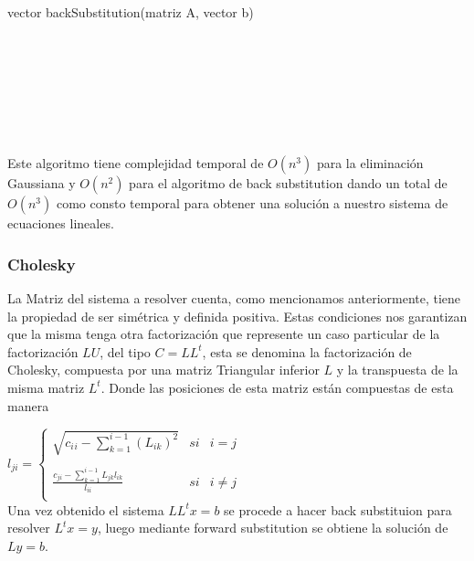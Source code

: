 \begin{algorithm}
    \begin{algorithmic}[1]\parskip=2mm
        \caption{vector backSubstitution(matriz A, vector b)}
        \\
        \\
        \\
        \\
        \\
        \\
    \end{algorithmic}
\end{algorithm}

Este algoritmo tiene complejidad temporal de $O(n^{3})$ para la eliminación Gaussiana y $O(n^{2})$ para el algoritmo de back substitution dando un total de $O(n^{3})$ como consto temporal para obtener una solución a nuestro sistema de ecuaciones lineales.

\newpage
\subsubsection{Cholesky}
La Matriz del sistema a resolver cuenta, como mencionamos anteriormente, tiene la propiedad de ser simétrica y definida positiva. Estas condiciones nos garantizan que la misma tenga otra factorización que represente un caso particular de la factorización $LU$, del tipo $C=LL^{t}$, esta se denomina la factorización de Cholesky, compuesta por una matriz Triangular inferior $L$ y la transpuesta de la misma matriz $L^{t}$. Donde las posiciones de esta matriz están compuestas de esta manera

$l_{ji} =
\left\{
    \begin{array}{lcc}
        \sqrt{c{_i}{_i} - \sum\limits_{k=1}^{i-1} (L_{ik})^2} & si & i = j \\
        \\ \frac{c_{ji} - \sum\limits_{k=1}^{i-1} L_{jk}l_{ik}}{l_{ii}} & si & i \neq j \\
    \end{array}
\right.$ \\

Una vez obtenido el sistema $LL^tx=b$ se procede a hacer back substituion para resolver $L^tx=y$, luego mediante forward substitution se obtiene la solución de $Ly=b$.

